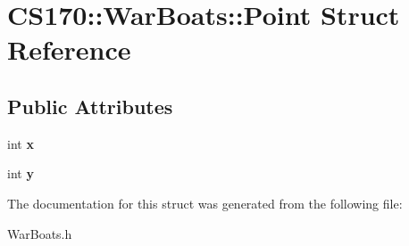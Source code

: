 \hypertarget{struct_c_s170_1_1_war_boats_1_1_point}{\section{C\-S170\-:\-:War\-Boats\-:\-:Point Struct Reference}
\label{struct_c_s170_1_1_war_boats_1_1_point}
}
\subsection*{Public Attributes}
\begin{DoxyCompactItemize}
\item 
\hypertarget{struct_c_s170_1_1_war_boats_1_1_point_abd9a13fa85fd7a008381cce739183d7b}{int {\bfseries x}}\label{struct_c_s170_1_1_war_boats_1_1_point_abd9a13fa85fd7a008381cce739183d7b}

\item 
\hypertarget{struct_c_s170_1_1_war_boats_1_1_point_aecb8d42f3d504498e8b4252914368e97}{int {\bfseries y}}\label{struct_c_s170_1_1_war_boats_1_1_point_aecb8d42f3d504498e8b4252914368e97}

\end{DoxyCompactItemize}


The documentation for this struct was generated from the following file\-:\begin{DoxyCompactItemize}
\item 
War\-Boats.\-h\end{DoxyCompactItemize}
